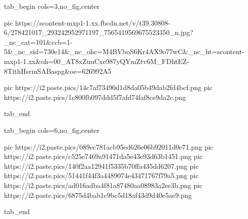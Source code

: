  
 
 
 
 


\ifcmt
  tab_begin cols=3,no_fig,center

     pic https://scontent-mxp1-1.xx.fbcdn.net/v/t39.30808-6/278421017_293242952971197_7565419569675523350_n.jpg?_nc_cat=101&ccb=1-5&_nc_sid=730e14&_nc_ohc=M4BVboS6Kr4AX9o77wC&_nc_ht=scontent-mxp1-1.xx&oh=00_AT8xZuuCxe987yQYmZtv6M_FDhtEZ-8TithHsrmSABaspg&oe=626992A5
		 
		 pic https://i2.paste.pics/14c7af73490d1d8da05b49dab2fd4bcf.png
		 pic https://i2.paste.pics/1c800fb097ddd5f7afd74faf8ce9da2c.png

  tab_end
\fi

\ifcmt
  tab_begin cols=6,no_fig,center

     pic https://i2.paste.pics/089ec781acb95ed626e06b92011d0e71.png
		 pic https://i2.paste.pics/c525e7469a91471da5e43e93d63b1451.png
		 pic https://i2.paste.pics/140f2aa12941f5335b70ffa435dd6207.png
		 pic https://i2.paste.pics/51441f44f3a4489074e43471767f79a5.png
		 pic https://i2.paste.pics/ad016adba4f81a87480aa08983a2ee3b.png
		 pic https://i2.paste.pics/6875d4bab1c9bc5d18af43d9d40e5ae9.png

  tab_end
\fi
